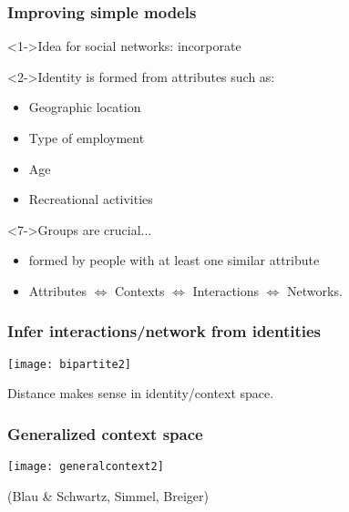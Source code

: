 \begin{frame}
  \frametitle{Improving simple models}
 
  \begin{block}<1->{Idea for social networks: incorporate }
  \end{block}
 
   \begin{block}<2->{Identity is formed from attributes such as:}
   \begin{itemize}
   \item<3-> Geographic location
   \item<4-> Type of employment
   \item<5-> Age
   \item<6-> Recreational activities
   \end{itemize}
   \end{block}
 
   \begin{block}<7->{Groups are crucial...}
     \begin{itemize}
     \item<8-> formed by people with at least one similar attribute
     \item<9-> 
       Attributes $\Leftrightarrow$ 
       Contexts $\Leftrightarrow$ 
       Interactions $\Leftrightarrow$ 
       Networks.\cite{watts2002b}
     \end{itemize}
   \end{block}
 
\end{frame}

\begin{frame}
  \frametitle{Infer interactions/network from identities}
 
   \texttt{[image: bipartite2]}

   \medskip
   Distance makes sense in identity/context space.
 
\end{frame}

\begin{frame}
  \frametitle{Generalized context space}
 
   \centering
   \texttt{[image: generalcontext2]}

   \bigskip

   (Blau \& Schwartz\cite{blau1984a}, Simmel\cite{simmel1902a}, Breiger\cite{breiger1974a})
\end{frame}


